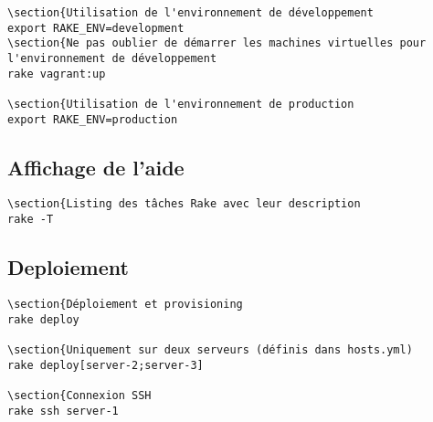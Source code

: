 \documentclass[a4paper,oneside,10pt]{article}
\begin{document}
\begin{verbatim}
\section{Utilisation de l'environnement de développement
export RAKE_ENV=development
\section{Ne pas oublier de démarrer les machines virtuelles pour l'environnement de développement
rake vagrant:up

\section{Utilisation de l'environnement de production
export RAKE_ENV=production
\end{verbatim}

\subsection{Affichage de l'aide}

\begin{verbatim}
\section{Listing des tâches Rake avec leur description
rake -T
\end{verbatim}

\subsection{Deploiement}

\begin{verbatim}
\section{Déploiement et provisioning
rake deploy

\section{Uniquement sur deux serveurs (définis dans hosts.yml)
rake deploy[server-2;server-3]

\section{Connexion SSH
rake ssh server-1
\end{verbatim}
\end{document}
